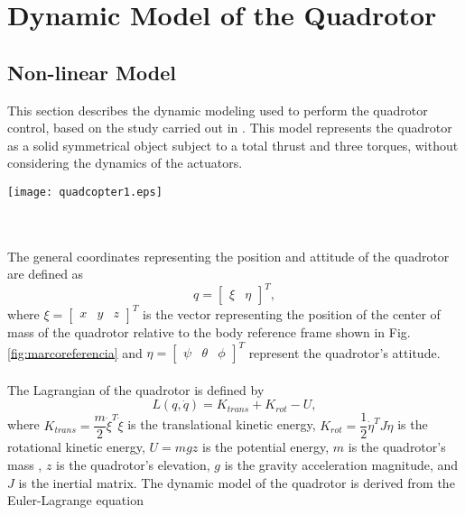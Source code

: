 \chapter{Dynamic Model of the Quadrotor \label{ch:model}}


\section{Non-linear Model}

This section describes the dynamic modeling used to perform the quadrotor control, based on the study carried out in \cite{modelamiento, modelamientoPDAFC, modelamientoNCQ}. This model represents the quadrotor as a solid symmetrical object subject to a total thrust and three torques, without considering the dynamics of the actuators.
\begin{figure*}
\begin{center}
  \texttt{[image: quadcopter1.eps]}
\caption{Quadrotor squeme with movement axis and thrust forces.} 
    \label{fig:marcoreferencia}
    \end{center}
\end{figure*}
\\\\The general coordinates representing the position and attitude of the quadrotor are defined as
\begin{equation}
	q=\begin{bmatrix}
	\xi & \eta
	\end{bmatrix}^{T},
	\label{ec:coorgenerales}
\end{equation}
where $\xi=\begin{bmatrix}
x & y & z
\end{bmatrix}^{T}$ is the vector representing the position of the center of mass of the quadrotor relative to the body reference frame shown in Fig. \ref{fig:marcoreferencia} and $\eta=\begin{bmatrix}
\psi & \theta & \phi
\end{bmatrix}^{T}$ represent the quadrotor's attitude.
\\\\
The Lagrangian of the quadrotor is defined by
\begin{equation}
	L(q,\dot{q})=K_{trans}+K_{rot} - U,	
	\label{ec:lagrangiano}
\end{equation}
where $ K_{trans} = \dfrac{m}{2}\dot{\xi}^{T}\dot{\xi} $ is the translational kinetic energy, $ K_{rot} = \dfrac{1}{2}\dot{\eta}^{T}J\dot{\eta} $ is the rotational kinetic energy, $ U=mgz $ is the potential energy, $m$ is the quadrotor's mass , $z$ is the quadrotor's elevation, $g$ is the gravity acceleration magnitude, and $J$ is the inertial matrix. The dynamic model of the quadrotor is derived from the Euler-Lagrange equation
